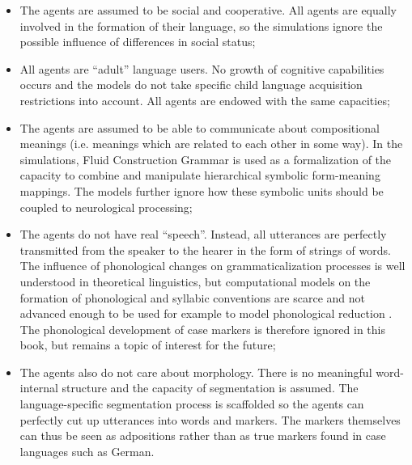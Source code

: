 \begin{itemize}
\item The agents are assumed to be social and cooperative. All agents are equally involved in the formation of their language, so the simulations ignore the possible influence of differences in social status;
\item All agents are ``adult'' language users. No growth of cognitive capabilities occurs and the models do not take specific child language acquisition restrictions into account. All agents are endowed with the same capacities;
\item The agents are assumed to be able to communicate about compositional meanings (i.e. meanings which are related to each other in some way). In the simulations, Fluid Construction Grammar is used as a formalization of the capacity to combine and manipulate hierarchical symbolic form-meaning mappings. The models further ignore how these symbolic units should be coupled to neurological processing;
\item The agents do not have real ``speech''. Instead, all utterances are perfectly transmitted from the speaker to the hearer in the form of strings of words. The influence of phonological changes on grammaticalization processes is well understood in theoretical linguistics, but computational models on the formation of phonological and syllabic conventions are scarce and not advanced enough to be used for example to model phonological reduction \citep[although see][]{steels98stochasticity}. The phonological development of case markers is therefore ignored in this book, but remains a topic of interest for the future;
\item The agents also do not care about morphology. There is no meaningful word-internal structure and the capacity of segmentation is assumed. The language-specific segmentation process is scaffolded so the agents can perfectly cut up utterances into words and markers. The markers themselves can thus be seen as adpositions rather than as true markers found in case languages such as German.
\end{itemize}

